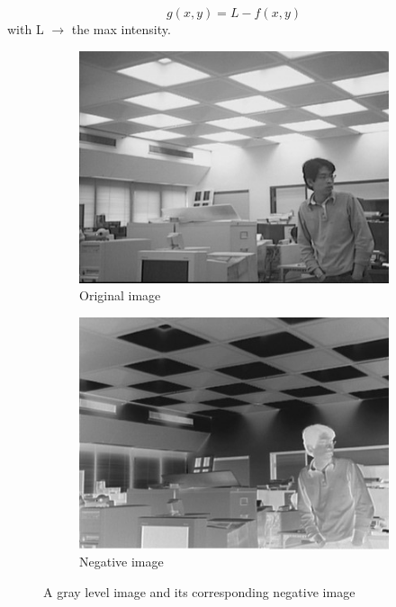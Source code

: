         \begin{equation}
                g(x,y) = L - f(x,y)
                \label{eq:equation3}
        \end{equation}
with L $\rightarrow$ the max intensity.

        \begin{figure}[h]
                \centering
                \begin{subfigure}[b]{0.46\textwidth}
                        \centering
                        \includegraphics[width=\textwidth]{chapiter1/figures/original-negative-image.jpg}
                        \caption{Original image}
                \end{subfigure}
                \hfill
                \begin{subfigure}[b]{0.46\textwidth}
                        \centering
                        \includegraphics[width=\textwidth]{chapiter1/figures/negative-image.jpg}
                        \caption{Negative image}
                \end{subfigure}
                \caption{A gray level image and its corresponding negative image}
                \label{fig:figure1.8}
        \end{figure}

